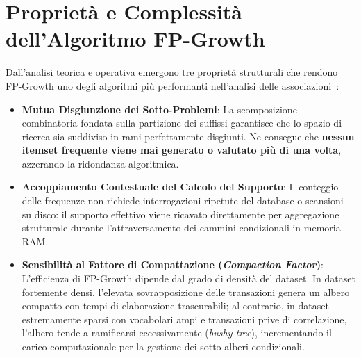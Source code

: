 \FloatBarrier
\section{Proprietà e Complessità dell'Algoritmo FP-Growth}
\label{sec:dm-fp-properties-complexity}

Dall'analisi teorica e operativa emergono tre proprietà strutturali che rendono FP-Growth uno degli algoritmi più performanti nell'analisi delle associazioni~\cite{han2000}:
\begin{itemize}
    \item \textbf{Mutua Disgiunzione dei Sotto-Problemi}: La scomposizione combinatoria fondata sulla partizione dei suffissi garantisce che lo spazio di ricerca sia suddiviso in rami perfettamente disgiunti. Ne consegue che \textbf{nessun itemset frequente viene mai generato o valutato più di una volta}, azzerando la ridondanza algoritmica.
    \item \textbf{Accoppiamento Contestuale del Calcolo del Supporto}: Il conteggio delle frequenze non richiede interrogazioni ripetute del database o scansioni su disco: il supporto effettivo viene ricavato direttamente per aggregazione strutturale durante l'attraversamento dei cammini condizionali in memoria RAM.
    \item \textbf{Sensibilità al Fattore di Compattazione (\textit{Compaction Factor})}: L'efficienza di FP-Growth dipende dal grado di densità del dataset. In dataset fortemente densi, l'elevata sovrapposizione delle transazioni genera un albero compatto con tempi di elaborazione trascurabili; al contrario, in dataset estremamente sparsi con vocabolari ampi e transazioni prive di correlazione, l'albero tende a ramificarsi eccessivamente (\textit{bushy tree}), incrementando il carico computazionale per la gestione dei sotto-alberi condizionali.
\end{itemize}


\FloatBarrier
